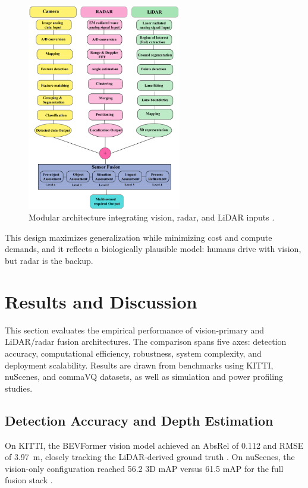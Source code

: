 \documentclass[12pt]{article}
\begin{document}
\begin{figure}[H]
	\centering
	\includegraphics[width=0.6\textwidth]{multimodelarch}
	\caption{Modular architecture integrating vision, radar, and LiDAR inputs \autocite{Hasanujjaman2023}.}
	\label{fig:multiarch}
\end{figure}

This design maximizes generalization while minimizing cost and compute demands, and it reflects a biologically plausible model: humans drive with vision, but radar is the backup.

\section{Results and Discussion}

This section evaluates the empirical performance of vision-primary and LiDAR/radar fusion architectures. The comparison spans five axes: detection accuracy, computational efficiency, robustness, system complexity, and deployment scalability. Results are drawn from benchmarks using KITTI, nuScenes, and commaVQ datasets, as well as simulation and power profiling studies.

\subsection{Detection Accuracy and Depth Estimation}

On KITTI, the BEVFormer vision model achieved an AbsRel of 0.112 and RMSE of \SI{3.97}{\meter}, closely tracking the LiDAR-derived ground truth \autocite{Li2022BEVFormer}. On nuScenes, the vision-only configuration reached 56.2 3D mAP versus 61.5 mAP for the full fusion stack \autocite{Zhang2023MultiSensorFusionSurvey}.
\end{document}
